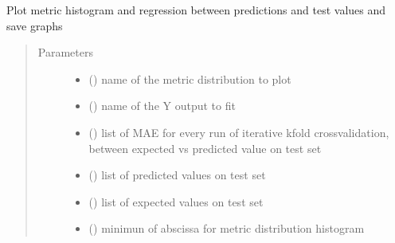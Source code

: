 \documentclass[letterpaper,10pt,english]{sphinxmanual}
\begin{document}
\begin{fulllineitems}
\label{\detokenize{MultipleRegression:MultipleRegression.plot_result}}
\sphinxAtStartPar
Plot metric histogram and regression between predictions and test values and save graphs
\begin{quote}\begin{description}
\item[{Parameters}] \leavevmode\begin{itemize}
\item {} 
\sphinxAtStartPar
{} () \textendash{} name of the metric distribution to plot

\item {} 
\sphinxAtStartPar
{} () \textendash{} name of the Y output to fit

\item {} 
\sphinxAtStartPar
{} () \textendash{} list of MAE for every run of iterative k\sphinxhyphen{}fold crossvalidation, between expected vs predicted value on test set

\item {} 
\sphinxAtStartPar
{} () \textendash{} list of predicted values on test set

\item {} 
\sphinxAtStartPar
{} () \textendash{} list of expected values on test set

\item {} 
\sphinxAtStartPar
{} () \textendash{} minimun of abscissa for metric distribution histogram


\end{itemize}
\end{description}
\end{quote}
\end{fulllineitems}
\end{document}
